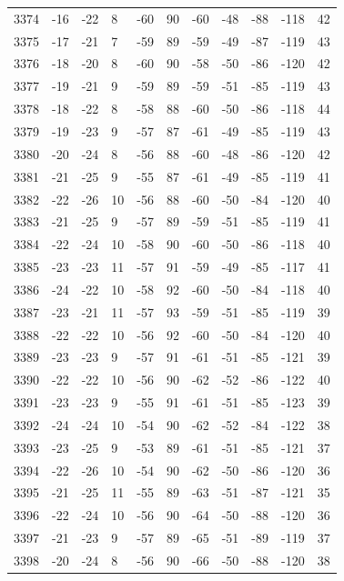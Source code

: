 \begin{table}[H]
\begin{tabular}{lllllllllll}
3374 & -16 & -22 & 8 & -60 & 90 & -60 & -48 & -88 & -118 & 42 \\
3375 & -17 & -21 & 7 & -59 & 89 & -59 & -49 & -87 & -119 & 43 \\
3376 & -18 & -20 & 8 & -60 & 90 & -58 & -50 & -86 & -120 & 42 \\
3377 & -19 & -21 & 9 & -59 & 89 & -59 & -51 & -85 & -119 & 43 \\
3378 & -18 & -22 & 8 & -58 & 88 & -60 & -50 & -86 & -118 & 44 \\
3379 & -19 & -23 & 9 & -57 & 87 & -61 & -49 & -85 & -119 & 43 \\
3380 & -20 & -24 & 8 & -56 & 88 & -60 & -48 & -86 & -120 & 42 \\
3381 & -21 & -25 & 9 & -55 & 87 & -61 & -49 & -85 & -119 & 41 \\
3382 & -22 & -26 & 10 & -56 & 88 & -60 & -50 & -84 & -120 & 40 \\
3383 & -21 & -25 & 9 & -57 & 89 & -59 & -51 & -85 & -119 & 41 \\
3384 & -22 & -24 & 10 & -58 & 90 & -60 & -50 & -86 & -118 & 40 \\
3385 & -23 & -23 & 11 & -57 & 91 & -59 & -49 & -85 & -117 & 41 \\
3386 & -24 & -22 & 10 & -58 & 92 & -60 & -50 & -84 & -118 & 40 \\
3387 & -23 & -21 & 11 & -57 & 93 & -59 & -51 & -85 & -119 & 39 \\
3388 & -22 & -22 & 10 & -56 & 92 & -60 & -50 & -84 & -120 & 40 \\
3389 & -23 & -23 & 9 & -57 & 91 & -61 & -51 & -85 & -121 & 39 \\
3390 & -22 & -22 & 10 & -56 & 90 & -62 & -52 & -86 & -122 & 40 \\
3391 & -23 & -23 & 9 & -55 & 91 & -61 & -51 & -85 & -123 & 39 \\
3392 & -24 & -24 & 10 & -54 & 90 & -62 & -52 & -84 & -122 & 38 \\
3393 & -23 & -25 & 9 & -53 & 89 & -61 & -51 & -85 & -121 & 37 \\
3394 & -22 & -26 & 10 & -54 & 90 & -62 & -50 & -86 & -120 & 36 \\
3395 & -21 & -25 & 11 & -55 & 89 & -63 & -51 & -87 & -121 & 35 \\
3396 & -22 & -24 & 10 & -56 & 90 & -64 & -50 & -88 & -120 & 36 \\
3397 & -21 & -23 & 9 & -57 & 89 & -65 & -51 & -89 & -119 & 37 \\
3398 & -20 & -24 & 8 & -56 & 90 & -66 & -50 & -88 & -120 & 38 \\

\end{tabular}
\end{table}
